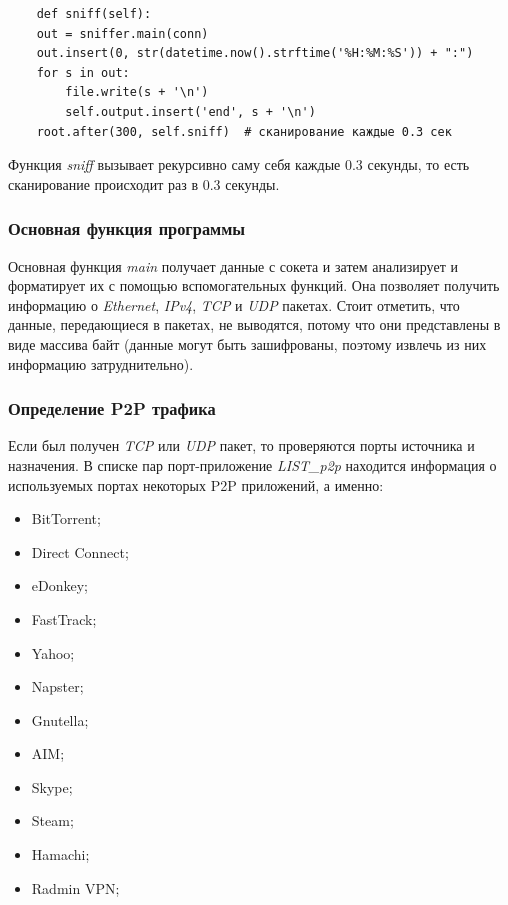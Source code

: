 \documentclass[bachelor, och, coursework]{SCWorks}
\begin{document}
\begin{verbatim}
    def sniff(self):
    out = sniffer.main(conn)
    out.insert(0, str(datetime.now().strftime('%H:%M:%S')) + ":")
    for s in out:
        file.write(s + '\n')
        self.output.insert('end', s + '\n')
    root.after(300, self.sniff)  # сканирование каждые 0.3 сек
\end{verbatim}

Функция \textit{sniff} вызывает рекурсивно саму себя каждые 0.3 секунды, то есть сканирование происходит раз в 0.3 секунды. 

\subsubsection{Основная функция программы}
Основная функция \textit{main} получает данные с сокета и затем анализирует и форматирует их с помощью вспомогательных функций. Она позволяет получить информацию о \textit{Ethernet}, \textit{IPv4}, \textit{TCP} и \textit{UDP} пакетах. Стоит отметить, что данные, передающиеся в пакетах, не выводятся, потому что они представлены в виде массива байт (данные могут быть зашифрованы, поэтому извлечь из них информацию затруднительно). 

\subsubsection{Определение P2P трафика}
Если был получен \textit{TCP} или \textit{UDP} пакет, то проверяются порты источника и назначения. В списке пар порт-приложение \textit{LIST_p2p} находится информация о используемых портах некоторых P2P приложений, а именно:

\begin{itemize}
    \item BitTorrent;
    \item Direct Connect;
    \item eDonkey;
    \item FastTrack;
    \item Yahoo;
    \item Napster;
    \item Gnutella;
    \item AIM;
    \item Skype;
    \item Steam;
    \item Hamachi;
    \item Radmin VPN;
\end{itemize}
\end{document}
